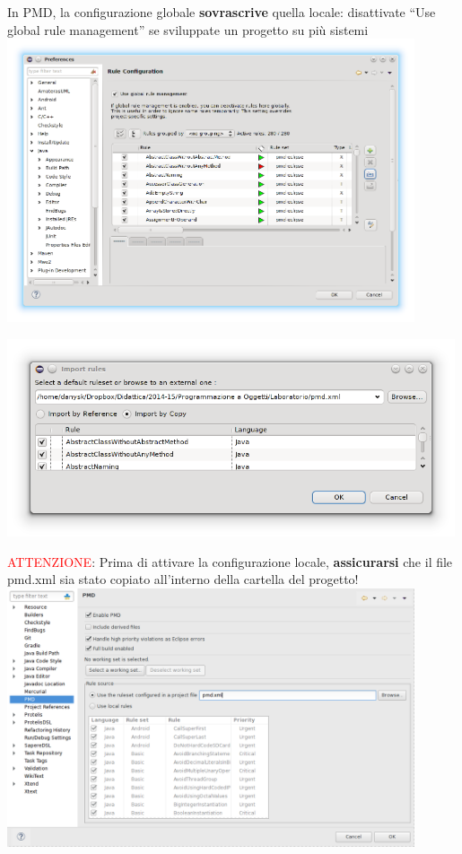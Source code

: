 \documentclass[presentation]{beamer}
\begin{document}
 {
  In PMD, la configurazione globale \textbf{sovrascrive} quella locale: disattivate ``Use global rule management'' se sviluppate un progetto su più sistemi
  \centering
  \includegraphics[width=0.9\textwidth]{img/pmdconf1}
}

 {
	\centering
	\includegraphics[width=0.99\textwidth]{img/pmdimport}
}

 {
	\textcolor{red}{ATTENZIONE}: Prima di attivare la configurazione locale, \textbf{assicurarsi} che il file pmd.xml sia stato copiato all'interno della cartella del progetto!
	\centering
	\includegraphics[width=0.9\textwidth]{img/pmdproj}
}
\end{document}
